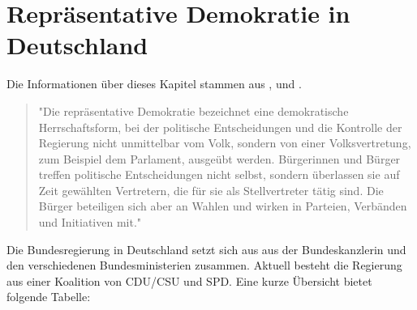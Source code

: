 \section{Repräsentative Demokratie in Deutschland}
Die Informationen über dieses Kapitel stammen aus \cite{bundestag}, \cite{bundesregierung} und \cite{wikipedia}.
\begin{quote}
"Die repräsentative Demokratie bezeichnet eine demokratische Herrschaftsform, bei der politische Entscheidungen und die Kontrolle der Regierung nicht unmittelbar vom Volk, sondern von einer Volksvertretung, zum Beispiel dem Parlament, ausgeübt werden.
Bürgerinnen und Bürger treffen politische Entscheidungen nicht selbst, sondern überlassen sie auf Zeit gewählten Vertretern, die für sie als Stellvertreter tätig sind. Die Bürger beteiligen sich aber an Wahlen und wirken in Parteien, Verbänden und Initiativen mit."
\end{quote}
\cite{bundestag}
Die Bundesregierung in Deutschland setzt sich aus aus der Bundeskanzlerin und den verschiedenen Bundesministerien zusammen. Aktuell besteht die Regierung aus einer Koalition von CDU/CSU und SPD. Eine kurze Übersicht bietet folgende Tabelle: \\
